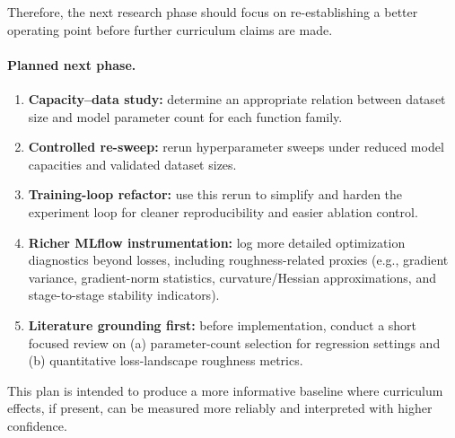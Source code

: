 Therefore, the next research phase should focus on re-establishing a better
operating point before further curriculum claims are made.

\paragraph{Planned next phase.}
\begin{enumerate}
    \item \textbf{Capacity--data study:} determine an appropriate relation between
          dataset size and model parameter count for each function family.
    \item \textbf{Controlled re-sweep:} rerun hyperparameter sweeps under reduced
          model capacities and validated dataset sizes.
    \item \textbf{Training-loop refactor:} use this rerun to simplify and harden the
          experiment loop for cleaner reproducibility and easier ablation control.
    \item \textbf{Richer MLflow instrumentation:} log more detailed optimization
          diagnostics beyond losses, including roughness-related proxies
          (e.g., gradient variance, gradient-norm statistics, curvature/Hessian
          approximations, and stage-to-stage stability indicators).
    \item \textbf{Literature grounding first:} before implementation, conduct a short
          focused review on (a) parameter-count selection for regression settings
          and (b) quantitative loss-landscape roughness metrics.
\end{enumerate}

This plan is intended to produce a more informative baseline where curriculum
effects, if present, can be measured more reliably and interpreted with higher
confidence.
